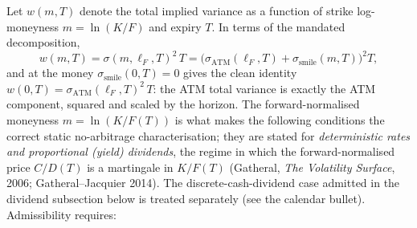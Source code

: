 \documentclass[11pt]{book}
\theoremstyle{plain}
\theoremstyle{definition}
\theoremstyle{remark}
\newcommand{\mln}{m}                             %
\newcommand{\lF}{\ell_F}                         %
\newcommand{\ssm}{\sigma_{\mathrm{smile}}}       %
\newcommand{\satm}{\sigma_{\mathrm{ATM}}}        %
\begin{document}
Let $w(\mln,T)$ denote the total implied variance as a function of strike
log-moneyness $\mln=\ln(K/F)$ and expiry $T$. In terms of the mandated
decomposition,
\[
    w(\mln,T) = \sigma(\mln,\lF,T)^2\,T
    = \bigl(\satm(\lF,T)+\ssm(\mln,T)\bigr)^2 T,
\]
and at the money $\ssm(0,T)=0$ gives the clean identity
$w(0,T)=\satm(\lF,T)^2\,T$: the ATM total variance is exactly the ATM component,
squared and scaled by the horizon. The forward-normalised moneyness
$\mln=\ln(K/F(T))$ is what makes the following conditions the correct static
no-arbitrage characterisation; they are stated for \emph{deterministic rates and
proportional (yield) dividends}, the regime in which the forward-normalised price
$C/D(T)$ is a martingale in $K/F(T)$ (Gatheral, \emph{The Volatility Surface},
2006; Gatheral--Jacquier 2014). The discrete-cash-dividend case admitted in the
dividend subsection below is treated separately (see the calendar bullet).
Admissibility requires:
\end{document}
